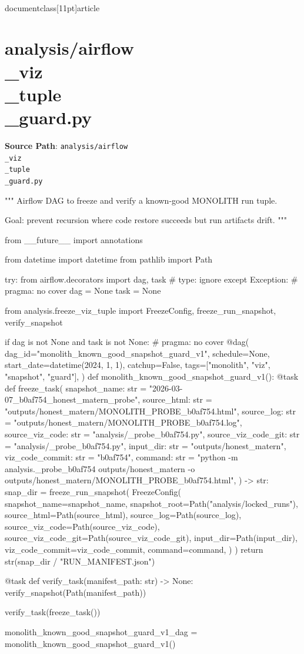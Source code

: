 \\documentclass[11pt]{article}
\begin{document}
\section*{analysis/airflow\\_viz\\_tuple\\_guard.py}
\textbf{Source Path}: \texttt{analysis/airflow\\_viz\\_tuple\\_guard.py}\par
\bigskip
\begin{CodeBlock}
"""
Airflow DAG to freeze and verify a known-good MONOLITH run tuple.

Goal: prevent recursion where code restore succeeds but run artifacts drift.
"""

from __future__ import annotations

from datetime import datetime
from pathlib import Path

try:
    from airflow.decorators import dag, task  # type: ignore
except Exception:  # pragma: no cover
    dag = None
    task = None

from analysis.freeze_viz_tuple import FreezeConfig, freeze_run_snapshot, verify_snapshot


if dag is not None and task is not None:  # pragma: no cover
    @dag(
        dag_id="monolith_known_good_snapshot_guard_v1",
        schedule=None,
        start_date=datetime(2024, 1, 1),
        catchup=False,
        tags=["monolith", "viz", "snapshot", "guard"],
    )
    def monolith_known_good_snapshot_guard_v1():
        @task
        def freeze_task(
            snapshot_name: str = "2026-03-07_b0af754_honest_matern_probe",
            source_html: str = "outputs/honest_matern/MONOLITH_PROBE_b0af754.html",
            source_log: str = "outputs/honest_matern/MONOLITH_PROBE_b0af754.log",
            source_viz_code: str = "analysis/_probe_b0af754.py",
            source_viz_code_git: str = "analysis/_probe_b0af754.py",
            input_dir: str = "outputs/honest_matern",
            viz_code_commit: str = "b0af754",
            command: str = "python -m analysis._probe_b0af754 outputs/honest_matern -o outputs/honest_matern/MONOLITH_PROBE_b0af754.html",
        ) -> str:
            snap_dir = freeze_run_snapshot(
                FreezeConfig(
                    snapshot_name=snapshot_name,
                    snapshot_root=Path("analysis/locked_runs"),
                    source_html=Path(source_html),
                    source_log=Path(source_log),
                    source_viz_code=Path(source_viz_code),
                    source_viz_code_git=Path(source_viz_code_git),
                    input_dir=Path(input_dir),
                    viz_code_commit=viz_code_commit,
                    command=command,
                )
            )
            return str(snap_dir / "RUN_MANIFEST.json")

        @task
        def verify_task(manifest_path: str) -> None:
            verify_snapshot(Path(manifest_path))

        verify_task(freeze_task())

    monolith_known_good_snapshot_guard_v1_dag = monolith_known_good_snapshot_guard_v1()

\end{CodeBlock}
\end{document}
